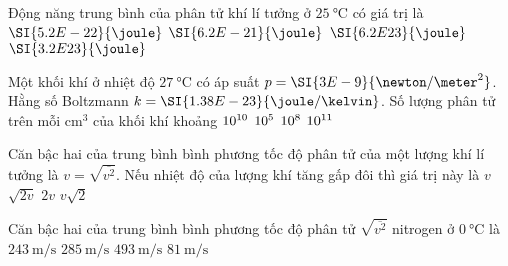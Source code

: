 \begin{ex}
Động năng trung bình của phân tử khí lí tưởng ở $\SI{25}{\celsius}$ có giá trị là
	\choice
	{$\SI{5.2E-22}{\joule}$}
	{\True $\SI{6.2E-21}{\joule}$}
	{$\SI{6.2E23}{\joule}$}
	{$\SI{3.2E23}{\joule}$}
\end{ex}
\begin{ex}
	Một khối khí ở nhiệt độ $\SI{27}{\celsius}$ có áp suất $p=\SI{3E-9}{\newton/\meter^2}$. Hằng số Boltzmann $k=\SI{1.38E-23}{\joule/\kelvin}$. Số lượng phân tử trên mỗi $\si{\centi\meter^3}$ của khối khí khoảng
	\choice
	{$\SI{E10}{}$}
	{$\SI{E5}{}$}
	{$\SI{E8}{}$}
	{\True $\SI{E11}{}$}
\end{ex}
\begin{ex}
	Căn bậc hai của trung bình bình phương tốc độ phân tử của một lượng khí lí tưởng là $v=\sqrt{\overline{v^2}}$. Nếu nhiệt độ của lượng khí tăng gấp đôi thì giá trị này là	
	\choice
	{$v$}
	{$\sqrt{2v}$}
	{$2v$}
	{\True $v\sqrt{2}$}
\end{ex}
\begin{ex}
	Căn bậc hai của trung bình bình phương tốc độ phân tử $\sqrt{\overline{v^2}}$ nitrogen ở $\SI{0}{\celsius}$ là	
	\choice
	{$\SI{243}{\meter/\second}$}
	{$\SI{285}{\meter/\second}$}
	{\True $\SI{493}{\meter/\second}$}
	{$\SI{81}{\meter/\second}$}
\end{ex}

